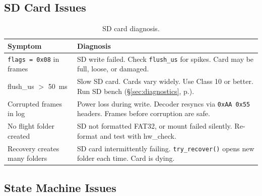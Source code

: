\documentclass[11pt, a4paper, twoside]{article}
\newcommand{\xref}[1]{(\S\ref{#1}, p.\pageref{#1})}
\begin{document}
\subsection{SD Card Issues}

\begin{table}[ht]
\centering
\small
\caption{SD card diagnosis.}
\label{tab:sd-diag}
\begin{tabularx}{\textwidth}{l X}
\toprule
\textbf{Symptom} & \textbf{Diagnosis} \\
\midrule
\texttt{flags = 0x08} in frames & SD write failed. Check \texttt{flush\_us} for spikes. Card may be full, loose, or damaged. \\
flush\_us $>$ \SI{50}{\milli\second} & Slow SD card. Cards vary widely. Use Class 10 or better. Run SD bench \xref{sec:diagnostics}. \\
Corrupted frames in log & Power loss during write. Decoder resyncs via \texttt{0xAA\,0x55} headers. Frames before corruption are safe. \\
No flight folder created & SD not formatted FAT32, or mount failed silently. Re-format and test with hw\_check. \\
Recovery creates many folders & SD card intermittently failing. \texttt{try\_recover()} opens new folder each time. Card is dying. \\
\bottomrule
\end{tabularx}
\end{table}

\subsection{State Machine Issues}
\end{document}
